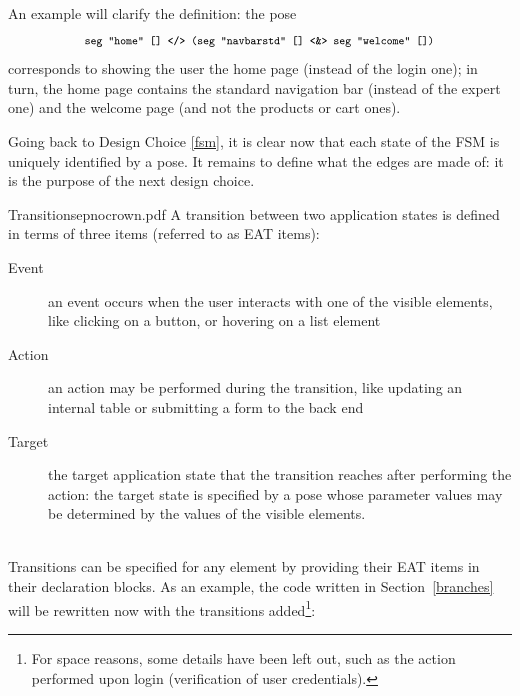 \documentclass[12pt]{article} %
\newcommand{\be}{back end}
\newcommand{\myverb}[1]{\texttt{\footnotesize #1}}
\begin{document}
An example will clarify the definition: the pose 
\[
\myverb{seg "home" [] </> (seg "navbarstd" [] <\&> seg "welcome" [])}
\]
corresponds to showing the user the home page (instead of the login one); in turn, the home page contains the standard navigation bar (instead of the expert one) and the welcome page (and not the products or cart ones).

Going back to Design Choice \ref{fsm}, it is clear now that each state of the FSM is uniquely identified by a pose.
It remains to define what the edges are made of: it is the purpose of the next design choice.
\\

\begin{dce}{Transition}{sep}{nocrown.pdf}
A transition between two application states is defined in terms of three items (referred to as EAT items):
\begin{description}
\item[Event] an event occurs when the user interacts with one of the visible elements, like clicking on a button, or hovering on a list element
\item[Action] an action may be performed during the transition, like updating an internal table or submitting a form to the \be{}
\item[Target] the target application state that the transition reaches after performing the action: the target state is specified by a pose whose parameter values may be determined by the values of the visible elements.
\end{description}
\end{dce}
~\\
Transitions can be specified for any element by providing their EAT items in their declaration blocks. As an example, the code written in Section~\ref{branches} will be rewritten now with the transitions added\footnote{For space reasons, some details have been left out, such as the action performed upon login (verification of user credentials).}:\\
\end{document}
